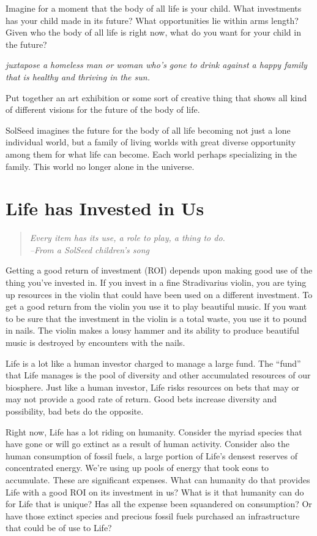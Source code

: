 \documentclass[ebook,11pt,openany,twoside,showtrims]{memoir}
\newcommand{\tab}{\hspace*{2em}}
\newcommand{\imagefacingchapter}[1]{
  \cleartoverso
  \clearpage \null
  \thispagestyle{cleared}
  \AddToShipoutPictureBG*{%
    \AtStockLowerLeft{%
      \texttt{[image: \#1]}
    }
  }
  \clearpage
}
\begin{document}
Imagine for a moment that the body of all life is your child. What investments
has your child made in its future? What opportunities lie within arms length?
Given who the body of all life is right now, what do you want for your child in
the future?

{
\em
juxtapose a homeless man or woman who's gone to drink against a happy family
that is healthy and thriving in the sun.

Put together an art exhibition or some sort of creative thing that shows all
kind of different visions for the future of the body of life.

SolSeed imagines the future for the body of all life becoming not just a lone
individual world, but a family of living worlds with great diverse opportunity
among them for what life can become. Each world perhaps specializing in the
family. This world no longer alone in the universe.
}

\imagefacingchapter{images/ViolinMaker-cropped}
\chapter{Life has Invested in Us}

\begin{quote}
	\em
Every item has its use, a role to play, a thing to do. \\
\tab \tab --From a SolSeed children's song
\end{quote}

Getting a good return of investment (ROI) depends upon making good use of the
thing you've invested in. If you invest in a fine Stradivarius violin, you are
tying up resources in the violin that could have been used on a different
investment. To get a good return from the violin you use it to play beautiful
music. If you want to be sure that the investment in the violin is a total
waste, you use it to pound in nails. The violin makes a lousy hammer and its
ability to produce beautiful music is destroyed by encounters with the nails.

Life is a lot like a human investor charged to manage a large fund. The
``fund'' that Life manages is the pool of diversity and other accumulated
resources of our biosphere. Just like a human investor, Life risks resources on
bets that may or may not provide a good rate of return. Good bets increase
diversity and possibility, bad bets do the opposite.

Right now, Life has a lot riding on humanity. Consider the myriad species that
have gone or will go extinct as a result of human activity. Consider also the
human consumption of fossil fuels, a large portion of Life's densest reserves
of concentrated energy. We're using up pools of energy that took eons to
accumulate. These are significant expenses. What can humanity do that provides
Life with a good ROI on its investment in us? What is it that humanity can do
for Life that is unique? Has all the expense been squandered on consumption? Or
have those extinct species and precious fossil fuels purchased an
infrastructure that could be of use to Life?
\end{document}
